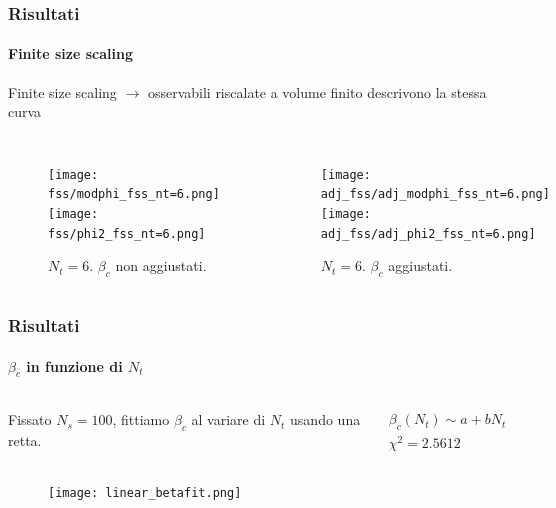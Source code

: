 \documentclass{beamer}
\begin{document}
\begin{frame}
	\frametitle{Risultati}
	\framesubtitle{Finite size scaling}
	
	\alert{Finite size scaling} $\rightarrow$ osservabili riscalate a volume finito descrivono la stessa curva

	\begin{columns}
			\begin{figure}[h]
				\centering
				\texttt{[image: fss/modphi\_fss\_nt=6.png]}
				\texttt{[image: fss/phi2\_fss\_nt=6.png]}
				\caption{$N_t = 6$. $\beta_c$ non aggiustati.}
			\end{figure}
			\begin{figure}[h]
				\centering
				\texttt{[image: adj\_fss/adj\_modphi\_fss\_nt=6.png]}
				\texttt{[image: adj\_fss/adj\_phi2\_fss\_nt=6.png]}
				\caption{$N_t = 6$. $\beta_c$ aggiustati.}
			\end{figure}
	\end{columns}
\end{frame}

\begin{frame}
	\frametitle{Risultati}
	\framesubtitle{$\beta_c$ in funzione di $N_t$}

	\begin{columns}
		\column{0.5\textwidth}
			Fissato $N_s = 100$, fittiamo $\beta_c$ al variare di $N_t$ usando una retta. 
			
			
		\column{0.5\textwidth}
		\begin{equation*}
			\begin{gathered}
				\beta_c(N_t) \sim a + bN_t \\
				\chi^2 = 2.5612
			\end{gathered}
		\end{equation*}
	\end{columns}

	\begin{figure}[h]
		\centering
		\texttt{[image: linear\_betafit.png]}
	\end{figure}
\end{frame}
\end{document}
